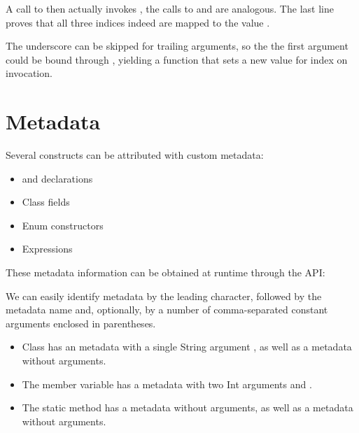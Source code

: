 \documentclass{haxe}
\begin{document}
A call to  then actually invokes , the calls to  and  are analogous. The last line proves that all three indices indeed are mapped to the value .

The underscore \expr{_} can be skipped for trailing arguments, so the the first argument could be bound through , yielding a  function that sets a new value for index  on invocation.




\section{Metadata}
\label{lf-metadata}

Several constructs can be attributed with custom metadata:

\begin{itemize}
	\item {} and  declarations
	\item Class fields
	\item Enum constructors
	\item Expressions
\end{itemize}

These metadata information can be obtained at runtime through the  API:


We can easily identify metadata by the leading  character, followed by the metadata name and, optionally, by a number of comma-separated constant arguments enclosed in parentheses.

\begin{itemize}
	\item Class  has an  metadata with a single String argument , as well as a  metadata without arguments.
	\item The member variable  has a  metadata with two Int arguments  and .
	\item The static method  has a  metadata without arguments, as well as a  metadata without arguments.
\end{itemize}
\end{document}
